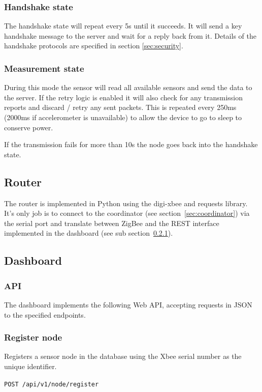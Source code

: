\documentclass[a4paper,11pt]{scrartcl}
\begin{document}
\subsubsection*{Handshake state}
The handshake state will repeat every 5s until it succeeds. It will send a key handshake message to the server and wait for a reply back from it. Details of the handshake protocols are specified in section \ref{sec:security}.

\subsubsection*{Measurement state}
During this mode the sensor will read all available sensors and send the data to the server. If the retry logic is enabled it will also check for any transmission reports and discard / retry any sent packets. This is repeated every 250ms (2000ms if accelerometer is unavailable) to allow the device to go to sleep to conserve power.

If the transmission fails for more than 10s the node goes back into the handshake state.

\subsection{Router}\label{subsec:router}
The router is implemented in Python using the digi-xbee and requests library. It's only job is to connect to the coordinator (see section~\ref{sec:coordinator}) via the serial port and translate between ZigBee and the REST interface implemented in the dashboard (see sub section~\ref{subsec:api}).

\subsection{Dashboard}
\subsubsection{API}\label{subsec:api}
The dashboard implements the following Web API, accepting requests in JSON to the specified endpoints.

\subsubsection*{Register node}
Registers a sensor node in the database using the Xbee serial number as the unique identifier.

\texttt{POST /api/v1/node/register}
\end{document}

